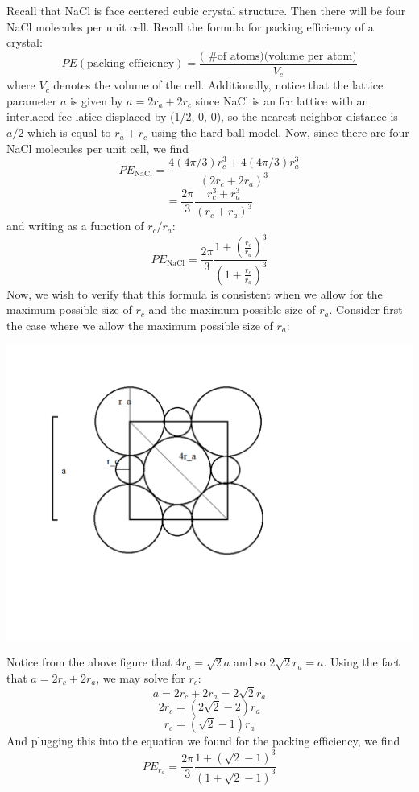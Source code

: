 \documentclass{article}
\begin{document}
Recall that NaCl is face centered cubic crystal structure. Then there will be four NaCl molecules per unit cell. Recall the formula for packing efficiency of a crystal:
\[PE (\text{packing efficiency}) = \frac{\text{( \# of atoms)(volume per atom)}}{V_c}\]
where $V_c$ denotes the volume of the cell. Additionally, notice that the lattice parameter $a$ is given by $a = 2r_a + 2r_c$ since NaCl is an fcc lattice with an interlaced fcc latice displaced by (1/2, 0, 0), so the nearest neighbor distance is $a/2$ which is equal to $r_a + r_c$ using the hard ball model. Now, since there are four NaCl molecules per unit cell, we find
\[PE_{\text{NaCl}} = \frac{4(4\pi/3)r_c^3 + 4(4\pi/3)r_a^3}{(2r_c + 2r_a)^3}\]
\[ = \frac{2\pi}{3}\frac{r_c^3 + r_a^3}{(r_c + r_a)^3}\]
and writing as a function of $r_c/r_a$:
\[PE_{\text{NaCl}} = \frac{2\pi}{3}\frac{1 + \left(\frac{r_c}{r_a}\right)^3}{\left(1 + \frac{r_c}{r_a}\right)^3}\]
Now, we wish to verify that this formula is consistent when we allow for the maximum possible size of $r_c$ and the maximum possible size of $r_a$. Consider first the case where we allow the maximum possible size of $r_a$:
\begin{center}
    \includegraphics[scale = 0.4]{NaClraLim.png}
\end{center}


Notice from the above figure that $4r_a = \sqrt{2}a$ and so $2\sqrt{2}r_a = a$. Using the fact that $a = 2r_c + 2r_a$, we may solve for $r_c$:
\[a = 2r_c + 2r_a = 2\sqrt{2}r_a\]
\[2r_c = (2\sqrt{2} - 2)r_a\]
\[r_c = (\sqrt{2} - 1)r_a\]
And plugging this into the equation we found for the packing efficiency, we find
\[PE_{r_a} = \frac{2\pi}{3}\frac{1 + (\sqrt{2} - 1)^3}{(1 + \sqrt{2} - 1)^3}\]
\end{document}
